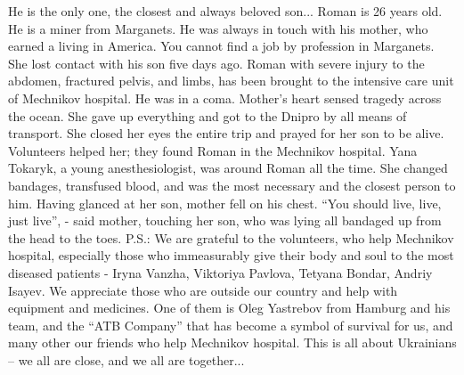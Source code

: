 \obeycr
He is the only one, the closest and always beloved son...
Roman is 26 years old. He is a miner from Marganets.
He was always in touch with his mother, who earned a living in America.
You cannot find a job by profession in Marganets.
She lost contact with his son five days ago.
Roman with severe injury to the abdomen, fractured pelvis, and limbs, has been brought to the intensive care unit of Mechnikov hospital. He was in a coma.
Mother's heart sensed tragedy across the ocean.
She gave up everything and got to the Dnipro by all means of transport.
She closed her eyes the entire trip and prayed for her son to be alive.
Volunteers helped her; they found Roman in the Mechnikov hospital.
Yana Tokaryk, a young anesthesiologist, was around Roman all the time.
She changed bandages, transfused blood, and was the most necessary and the closest person to him.
Having glanced at her son, mother fell on his chest.
\enquote{You should live, live, just live}, - said mother, touching her son, who was lying all bandaged up from the head to the toes.
P.S.: We are grateful to the volunteers, who help Mechnikov hospital, especially those who immeasurably give their body and soul to the most diseased patients - Iryna Vanzha, Viktoriya Pavlova, Tetyana Bondar, Andriy Isayev.
We appreciate those who are outside our country and help with equipment and medicines.
One of them is Oleg Yastrebov from Hamburg and his team, and the \enquote{ATB Company} that has become a symbol of survival for us, and many other our friends who help Mechnikov hospital.
This is all about Ukrainians – we all are close, and we all are together...
\restorecr


